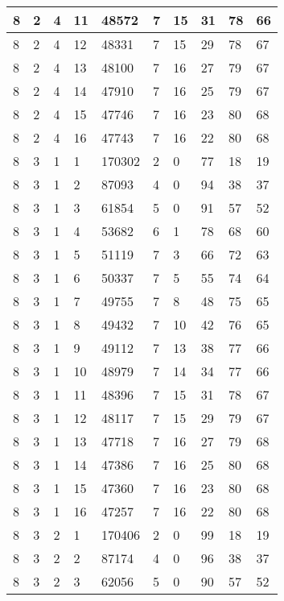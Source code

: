 \begin{table}[!ht]
\begin{tabular}{|l|l|l|l|l|l|l|l|l|l|}
        8 & 2 & 4 & 11 & 48572 & 7 & 15 & 31 & 78 & 66 \\ \hline
        8 & 2 & 4 & 12 & 48331 & 7 & 15 & 29 & 78 & 67 \\ \hline
        8 & 2 & 4 & 13 & 48100 & 7 & 16 & 27 & 79 & 67 \\ \hline
        8 & 2 & 4 & 14 & 47910 & 7 & 16 & 25 & 79 & 67 \\ \hline
        8 & 2 & 4 & 15 & 47746 & 7 & 16 & 23 & 80 & 68 \\ \hline
        8 & 2 & 4 & 16 & 47743 & 7 & 16 & 22 & 80 & 68 \\ \hline
        8 & 3 & 1 & 1 & 170302 & 2 & 0 & 77 & 18 & 19 \\ \hline
        8 & 3 & 1 & 2 & 87093 & 4 & 0 & 94 & 38 & 37 \\ \hline
        8 & 3 & 1 & 3 & 61854 & 5 & 0 & 91 & 57 & 52 \\ \hline
        8 & 3 & 1 & 4 & 53682 & 6 & 1 & 78 & 68 & 60 \\ \hline
        8 & 3 & 1 & 5 & 51119 & 7 & 3 & 66 & 72 & 63 \\ \hline
        8 & 3 & 1 & 6 & 50337 & 7 & 5 & 55 & 74 & 64 \\ \hline
        8 & 3 & 1 & 7 & 49755 & 7 & 8 & 48 & 75 & 65 \\ \hline
        8 & 3 & 1 & 8 & 49432 & 7 & 10 & 42 & 76 & 65 \\ \hline
        8 & 3 & 1 & 9 & 49112 & 7 & 13 & 38 & 77 & 66 \\ \hline
        8 & 3 & 1 & 10 & 48979 & 7 & 14 & 34 & 77 & 66 \\ \hline
        8 & 3 & 1 & 11 & 48396 & 7 & 15 & 31 & 78 & 67 \\ \hline
        8 & 3 & 1 & 12 & 48117 & 7 & 15 & 29 & 79 & 67 \\ \hline
        8 & 3 & 1 & 13 & 47718 & 7 & 16 & 27 & 79 & 68 \\ \hline
        8 & 3 & 1 & 14 & 47386 & 7 & 16 & 25 & 80 & 68 \\ \hline
        8 & 3 & 1 & 15 & 47360 & 7 & 16 & 23 & 80 & 68 \\ \hline
        8 & 3 & 1 & 16 & 47257 & 7 & 16 & 22 & 80 & 68 \\ \hline
        8 & 3 & 2 & 1 & 170406 & 2 & 0 & 99 & 18 & 19 \\ \hline
        8 & 3 & 2 & 2 & 87174 & 4 & 0 & 96 & 38 & 37 \\ \hline
        8 & 3 & 2 & 3 & 62056 & 5 & 0 & 90 & 57 & 52 \\ \hline

\end{tabular}
\end{table}
